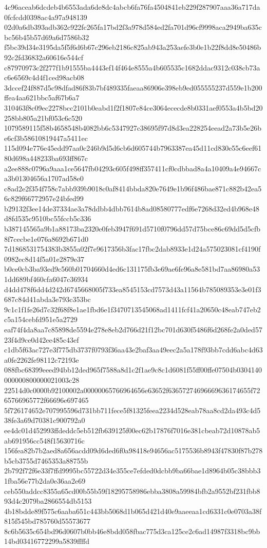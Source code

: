 {4c96aceab6dcdeb4b6553ada6de8dc4abcb6fa76fa4504841eb229f287907aaa36a717da0fcfcdd0398ac4a97a948139
02d0a6db393adb362c922fc265fa17bd2f3a978d584ed2fa701d96cf9998aca2949ba635cbc56b45b57d69a6d7586b32
f5bc39d34e3195da5f5f6d6b67c296eb2186c825ab943a253aefe3b0e1b22f8dd8e50486b92c2fd36832a60616e544cf
c87970973c2f277f1b91555ba4443ef14f464e8555a4b605535c1682ddac9312c038cb73ac6e6569c4d4f1ced98acb08
3dccef24f887d5c98dfad86f83b7bf489335faeaa86906e398eb9ed055555237d559e1b200ffea4aa621bbc5af67b6a7
310463f8c09ec2278bcc2101b0eabd1f2f1807e84ce3064ececde8b0331aef0553a4b5bd20258bb805a21bf053c6c520
1079589115f58b4658548b4082bb6c5347927c38695f97d8d3ea228254eead2a73b5e26be6cf3b58610819447a5411ec
115d094e776e45edd97aa0c246b9d5d6cb6d605744b7963387ea45d11cd830e55c6eef6180d698a448233ba693ff867c
a2ee888c0796a9aaa1ce5647fb04293c605f498ff357411cf0cdbbad8a4a10409a4e94667ca3b01304656a1707ad58e0
c8ad2e2f354f758c7abb939b9018c0af8414bbda820e7649e1b96f486bae871c882b42ea56c829f66772957e24bfed99
b29132f3ee14de37334ae3a78ddbb4dbb7614b8ad08580777edf6e7268d32ed4b968e48d8fd535c9510bc55fccb5c336
b387145565a9b1a88173ba2320e0feb3947f691d5710f0796dd57d75bce86c69dd5d5cfb8f7cecbe1e076a8692b671d0
7d1868531754383b3855a02f7e9617356b3fac17fbc2dab8933e1d24a575023081cf4190f0982ec8d14f5a01e2879e37
b0ce0cb3ba93ed9c560b01704660d4ed6c131175fb3e69ae6fe96a8e581bd7aa86980a531dd689bf460cfa6047c36934
d4dd478f6dd4d242d6745668005f733ea8545153cd7573d43a11564b785089353e3e01f3687c84d41abda3e793c353bc
9c1c1f1fe26d7c32f68f8e1ae1fbd6e1f3470713545068ad1411fcf41a20650c48eab747eb2c5a154cebfd951e5a2729
eaf74f4da8aa7c85898de5594e278e8eb2d766d21f12bc701d630f5486f6d268fe2a0ded5723f4d9ce0d42ee485c43ef
c1db5f63ac727e3f775db3737f0793f36aa43e2baf3aa49eec2a5a178f93bb7cdd6abc4d63a0fe2262fe98112c72193e
088fbc68399eeed94bb12ded965f7588a8d1c2f1ae9c8c1d6081f55ff00ffe07504b0304140000000800000021003c28
22514d0c0000b92100002a00000065766964656e63652f63657274696669636174655f7265766965772f66696e697465
5f726174652e707995596d731bb711fece5f81325feea2234d528eab78aa8cd2da493c4d538fe3a69d70381c900792a0
ee4dc01d452993ffdeddc5eb512fb639125f00ec62b17876f7016e381cbeab72d10878ab5ab691956cc548f15630716c
156fea82b7b2aed8a656acdd09d6ded6f0a98418e94656ac5175536b8943f47830f87b278b5cb3755d7465353a88755b
2b792f72f6e33f7ffd9995bc55722d34e355ce7efded0dcbb9ba66bae1d8964b05c38bbb31fba56e77b2da0e36aa2e69
ceb550addcc8355a65cd00b55b59f18295758986ebba3808a59984bfb2a9552bf231fbb893d4c2079ba2866554db5153
4b18bdde89f575c6aaba651c443bb5068d1b065d421d40e9aaeeaa1cd6331c0e0703a38f815f545bd785760d55573677
8c6b5635c654bd96d0607b0bb46e8bdd058fbac775d3ca125ce2c6ad14987f3318bc9bb14bd03416772299a5839ffffd
}
